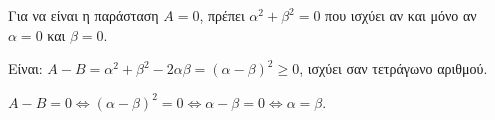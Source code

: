 
\begin{alist}
\item Για να είναι η παράσταση $A = 0$, πρέπει $\alpha^2 + \beta^2 = 0$ που ισχύει αν και μόνο αν $\alpha = 0$ και $\beta = 0$.

\item Είναι: $A - B = \alpha^2 + \beta^2 - 2\alpha\beta = (\alpha - \beta)^2 \ge 0$, ισχύει σαν τετράγωνο αριθμού.

\item $A - B = 0 \Leftrightarrow (\alpha - \beta)^2 = 0 \Leftrightarrow \alpha - \beta = 0 \Leftrightarrow \alpha = \beta$.
\end{alist}

